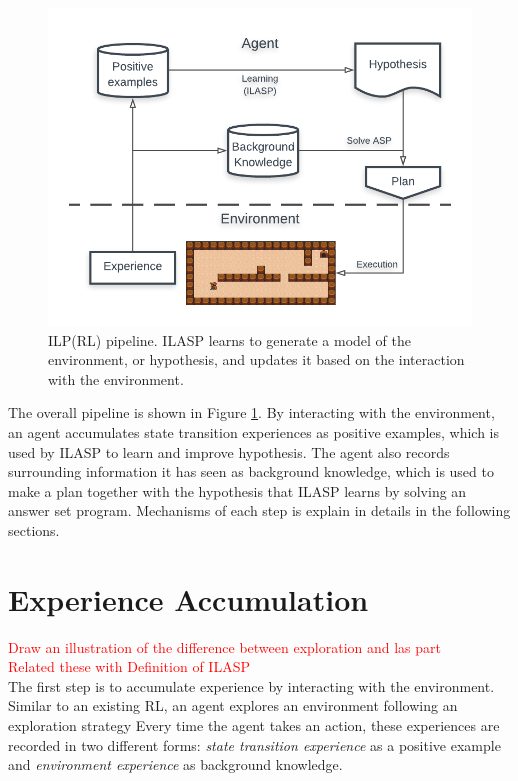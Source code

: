\begin{figure}[!htb]
\centering
\includegraphics[width=1.0\textwidth]{./figures/architecture}
\caption{ILP(RL) pipeline. ILASP learns to generate a model of the environment, or hypothesis, and updates it based on the interaction with the environment. }
\label{fig:pipeline}
\end{figure}

The overall pipeline is shown in Figure \ref{fig:pipeline}. By interacting with the environment, an agent accumulates state transition experiences as positive examples, which is used by ILASP to learn and improve hypothesis.
The agent also records surrounding information it has seen as background knowledge, which is used to make a plan together with the hypothesis that ILASP learns by solving an answer set program.
Mechanisms of each step is explain in details in the following sections.

\section{Experience Accumulation}
\label{experience_accumulation}
\textcolor{red}{Draw an illustration of the difference between exploration and las part}\\
\textcolor{red}{Related these with Definition of ILASP}\\

The first step is to accumulate experience by interacting with the environment. Similar to an existing RL, an agent explores an environment following an exploration strategy
Every time the agent takes an action, these experiences are recorded in two different forms: \textit{state transition experience} as a positive example and \textit{environment experience} as background knowledge.

